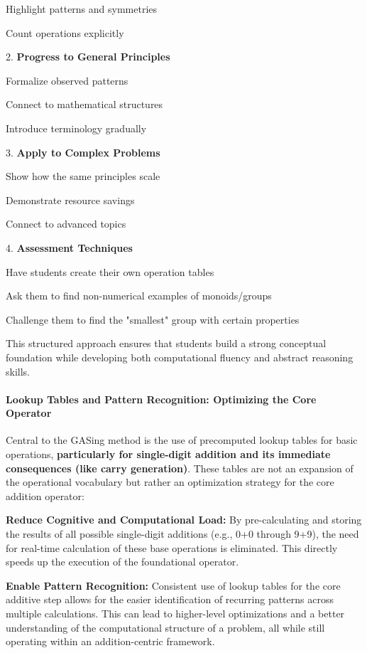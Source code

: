 \noindent Highlight patterns and symmetries


\noindent Count operations explicitly


2. \textbf{Progress to General Principles}

\noindent Formalize observed patterns


\noindent Connect to mathematical structures


\noindent Introduce terminology gradually


3. \textbf{Apply to Complex Problems}

\noindent Show how the same principles scale


\noindent Demonstrate resource savings


\noindent Connect to advanced topics


4. \textbf{Assessment Techniques}

\noindent Have students create their own operation tables


\noindent Ask them to find non-numerical examples of monoids/groups


\noindent Challenge them to find the "smallest" group with certain properties


This structured approach ensures that students build a strong conceptual foundation while developing both computational fluency and abstract reasoning skills.
\paragraph{Lookup Tables and Pattern Recognition: Optimizing the Core Operator}

Central to the GASing method is the use of precomputed lookup tables for basic operations, \textbf{particularly for single-digit addition and its immediate consequences (like carry generation)}. These tables are not an expansion of the operational vocabulary but rather an optimization strategy for the core addition operator:


\noindent\textbf{\textbf{Reduce Cognitive and Computational Load}:} By pre-calculating and storing the results of all possible single-digit additions (e.g., 0+0 through 9+9), the need for real-time calculation of these base operations is eliminated. This directly speeds up the execution of the foundational operator.


\noindent\textbf{\textbf{Enable Pattern Recognition}:} Consistent use of lookup tables for the core additive step allows for the easier identification of recurring patterns across multiple calculations. This can lead to higher-level optimizations and a better understanding of the computational structure of a problem, all while still operating within an addition-centric framework.


